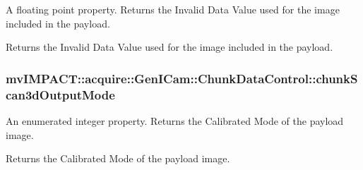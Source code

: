 A floating point property. Returns the Invalid Data Value used for the image included in the payload. 

Returns the Invalid Data Value used for the image included in the payload. \hypertarget{classmv_i_m_p_a_c_t_1_1acquire_1_1_gen_i_cam_1_1_chunk_data_control_a1b968c0335e50b8852709bc5d5cbcd93}{
\subsubsection[{chunk\+Scan3d\+Output\+Mode}]{ mv\+I\+M\+P\+A\+C\+T\+::acquire\+::\+Gen\+I\+Cam\+::\+Chunk\+Data\+Control\+::chunk\+Scan3d\+Output\+Mode}}\label{classmv_i_m_p_a_c_t_1_1acquire_1_1_gen_i_cam_1_1_chunk_data_control_a1b968c0335e50b8852709bc5d5cbcd93}


An enumerated integer property. Returns the Calibrated Mode of the payload image. 

Returns the Calibrated Mode of the payload image.

